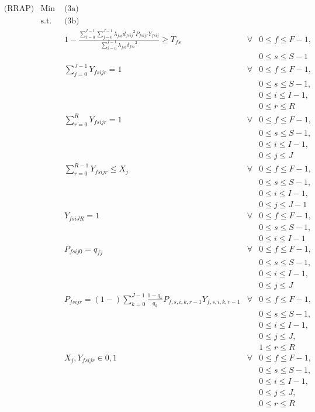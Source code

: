 \documentclass[11pt,]{article}
\begin{document}
\begin{align*}
& \text{(RRAP)} & \text{Min } & \text{(3a)}\\
%
& & \text{s.t. } & \text{(3b)}\\
%
& & & 1 - \frac{\sum_{i=0}^{I-1} \sum_{j=0}^{J-1} \lambda_{fsi} {d_{fsij}}^{2} P_{fsijr} Y_{fsij}}{\sum_{i=0}^{I-1} \lambda_{fsi} {\delta_{fsi}}^{2}} \geq T_{fs}  & \forall & 0 \leq f \leq F-1, \tag*{eqn 7a}\\
& & & & & 0 \leq s \leq S-1\\
%
& & & \sum_{j=0}^{J-1} Y_{fsijr} = 1 & \forall & 0 \leq f \leq F-1, \tag*{eqn 7b}\\
& & & & & 0 \leq s \leq S-1,\\
& & & & & 0 \leq i \leq I-1,\\
& & & & & 0 \leq r \leq R\\
%
& & & \sum_{r=0}^{R} Y_{fsijr} = 1 & \forall & 0 \leq f \leq F-1, \tag*{eqn 7c}\\
& & & & & 0 \leq s \leq S-1,\\
& & & & & 0 \leq i \leq I-1,\\
& & & & & 0 \leq j \leq J\\
%
& & & \sum_{r=0}^{R-1} Y_{fsijr} \leq X_j & \forall & 0 \leq f \leq F-1, \tag*{eqn 7d}\\
& & & & & 0 \leq s \leq S-1,\\
& & & & & 0 \leq i \leq I-1,\\
& & & & & 0 \leq j \leq J-1\\
%
& & & Y_{fsiJR} = 1 & \forall & 0 \leq f \leq F-1, \tag*{eqn 7e}\\
& & & & & 0 \leq s \leq S-1,\\
& & & & & 0 \leq i \leq I-1\\
%
& & & P_{fsij0} = q_{fj} & \forall & 0 \leq f \leq F-1, \tag*{eqn 7f}\\
& & & & & 0 \leq s \leq S-1,\\
& & & & & 0 \leq i \leq I-1,\\
& & & & & 0 \leq j \leq J\\
%
& & & P_{fsijr} = \left(1 - \right) \sum_{k=0}^{J-1} \frac{1 - q_k}{q_k} P_{f,s,i,k,r-1} Y_{f,s,i,k,r-1}  & \forall & 0 \leq f \leq F-1, \tag*{eqn 7g}\\
& & & & & 0 \leq s \leq S-1,\\
& & & & & 0 \leq i \leq I-1,\\
& & & & & 0 \leq j \leq J,\\
& & & & & 1 \leq r \leq R\\
%
& & & X_j, Y_{fsijr} \in {0,1} & \forall & 0 \leq f \leq F-1, \tag*{eqn 7h}\\
& & & & & 0 \leq s \leq S-1,\\
& & & & & 0 \leq i \leq I-1,\\
& & & & & 0 \leq j \leq J,\\
& & & & & 0 \leq r \leq R\\
\end{align*}
\end{document}
